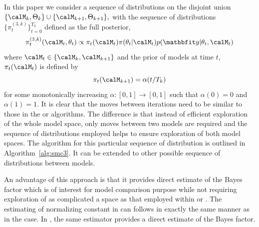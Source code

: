 In this paper we consider a sequence of distributions on the disjoint union
$\{\Mk,\Paramk\}\cup\{\Mk[k+1],\Paramk[k+1]\},$ with the sequence of
distributions $\{\pi_t^{(3,k)}\}_{t=0}^{T_k}$ defined as the full posterior,
\begin{equation}
  \pi_t^{(3,k)}(\Mk[t],\paramk[t]) \propto
  \pi_t(\Mk[t]) \pi(\paramk[t]|\Mk[t]) p(\data|\paramk[t],\Mk[t])
\end{equation}
where $\Mk[t]\in\{\Mk,\Mk[k+1]\}$ and the prior of models at time $t$,
$\pi_t(\Mk[t])$ is defined by
\begin{equation}
  \pi_t(\Mk[k+1]) = \alpha(t/T_k)
  \label{eq:smc3_prior}
\end{equation}
for some monotonically increasing $\alpha:[0,1]\to[0,1]$ such that $\alpha(0)
= 0$ and $\alpha(1) = 1$. It is clear that the \mcmc moves between iterations
need to be similar to those in the \rjmcmc or \smc[1] algorithms. The
difference is that instead of efficient exploration of the whole model space,
only moves between two models are required and the sequence of distributions
employed helps to ensure exploration of both model spaces. The algorithm for
this particular sequence of distribution is outlined in
Algorithm~\ref{alg:smc3}. It can be extended to other possible sequence of
distributions between models.

An advantage of this approach is that it provides direct estimate of the Bayes
factor which is of interest for model comparison purpose while not requiring
exploration of as complicated a space as that employed within \rjmcmc or
\smc[1]. The estimating of normalizing constant in \smc[3] can follows in
exactly the same manner as in the \smc[2] case. In \smc[3], the same
estimator provides a direct estimate of the Bayes factor.



